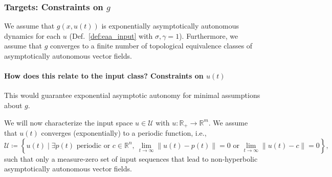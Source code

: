 \documentclass{article}
\theoremstyle{definition} \newtheorem{definition}{Definition}
\theoremstyle{remark} \newtheorem{remark}{Remark}
\newcommand{\reals}{\mathbb{R}}
\newcounter{ct}
\begin{document}




\subsubsection{Targets: Constraints on $g$}\label{sec:input_target}


We assume that $g(x,u(t))$ is exponentially asymptotically autonomous dynamics for each $u$ (Def.~\ref{def:eaa_input} with $\sigma,\gamma=1$). %
%
Furthermore, we assume that $g$ converges to a finite number of topological equivalence classes of asymptotically autonomous vector fields.


\paragraph{How does this relate to the input class? Constraints on $u(t)$}
This would guarantee exponential asymptotic autonomy for minimal assumptions about $g$. %

We will now characterize the input space 
$u\in \mathcal{U}$ with $u:\reals_+\rightarrow\reals^m$.
We assume that $u(t)$ converges (exponentially) to a periodic function, i.e., %
\begin{equation}
\mathcal{U} \coloneqq \left\{ u(t) \mid \exists p(t) \text{ periodic} \text{ or } c \in \mathbb{R}^n, \ \lim_{t \to \infty} \| u(t) - p(t) \| = 0 \text{ or } \lim_{t \to \infty} \| u(t) - c \| = 0 \right\},
\end{equation}
such that only a measure-zero set of input sequences that lead to non-hyperbolic asymptotically autonomous vector fields.
\end{document}
